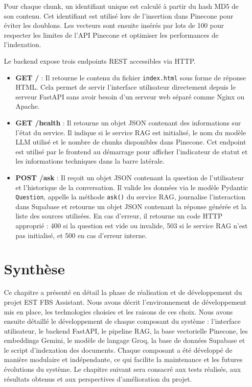 \documentclass[12pt, a4paper, twoside]{report}
\begin{document}
Pour chaque chunk, un identifiant unique est calculé à partir du hash MD5 de son contenu. Cet identifiant est utilisé lors de l'insertion dans Pinecone pour éviter les doublons. Les vecteurs sont ensuite insérés par lots de 100 pour respecter les limites de l'API Pinecone et optimiser les performances de l'indexation.
\newpage

Le backend expose trois endpoints REST accessibles via HTTP.

\begin{itemize}[label=\bullet]
    \item \textbf{GET /} : Il retourne le contenu du fichier \texttt{index.html} sous forme de réponse HTML. Cela permet de servir l'interface utilisateur directement depuis le serveur FastAPI sans avoir besoin d'un serveur web séparé comme Nginx ou Apache.
    \item \textbf{GET /health} : Il retourne un objet JSON contenant des informations sur l'état du service. Il indique si le service RAG est initialisé, le nom du modèle LLM utilisé et le nombre de chunks disponibles dans Pinecone. Cet endpoint est utilisé par le frontend au démarrage pour afficher l'indicateur de statut et les informations techniques dans la barre latérale.
    \item \textbf{POST /ask} : Il reçoit un objet JSON contenant la question de l'utilisateur et l'historique de la conversation. Il valide les données via le modèle Pydantic \texttt{Question}, appelle la méthode \texttt{ask()} du service RAG, journalise l'interaction dans Supabase et retourne un objet JSON contenant la réponse générée et la liste des sources utilisées. En cas d'erreur, il retourne un code HTTP approprié : 400 si la question est vide ou invalide, 503 si le service RAG n'est pas initialisé, et 500 en cas d'erreur interne.
\end{itemize}

\section{Synthèse}
Ce chapitre a présenté en détail la phase de réalisation et de développement du projet EST FBS Assistant. Nous avons décrit l'environnement de développement mis en place, les technologies choisies et les raisons de ces choix. Nous avons ensuite détaillé le développement de chaque composant du système : l'interface utilisateur, le backend FastAPI, le pipeline RAG, la base vectorielle Pinecone, les embeddings Gemini, le modèle de langage Groq, la base de données Supabase et le script d'indexation des documents. Chaque composant a été développé de manière modulaire et indépendante, ce qui facilite la maintenance et les futures évolutions du système. Le chapitre suivant sera consacré aux tests réalisés, aux résultats obtenus et aux perspectives d'amélioration du projet.
\end{document}
